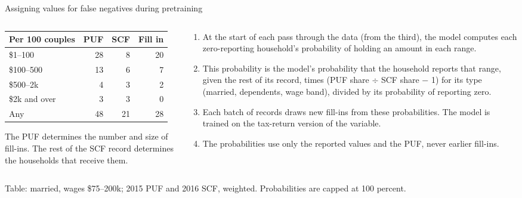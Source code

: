 \documentclass[11pt,aspectratio=169]{beamer}
\newcommand{\slidenote}[1]{\par\vfill{\scriptsize\color{yalegrey}#1}}
\begin{document}
\begin{frame}{Assigning values for false negatives during pretraining}
  \begin{columns}[T]
    \begin{column}{0.44\textwidth}
      \centering
      \small
      \begin{tabular}{lrrr}
        \toprule
        Per 100 couples & PUF & SCF & Fill in \\
        \midrule
        \$1--100      & 28 & 8 & 20 \\
        \$100--500    & 13 & 6 & 7 \\
        \$500--2k     & 4  & 3 & 2 \\
        \$2k and over & 3  & 3 & 0 \\
        \midrule
        Any           & 48 & 21 & 28 \\
        \bottomrule
      \end{tabular}

      \vspace{0.8em}
      \raggedright
      The PUF determines the number and size of fill-ins.
      The rest of the SCF record determines the households that receive them.
    \end{column}
    \begin{column}{0.53\textwidth}
      \footnotesize
      \begin{enumerate}
        \item At the start of each pass through the data (from the third), the model computes each
              zero-reporting household's probability of holding an amount in each range.
        \item This probability is the model's probability that the household reports that range,
              given the rest of its record, times (PUF share $\div$ SCF share $-$ 1) for its type
              (married, dependents, wage band), divided by its probability of reporting zero.
        \item Each batch of records draws new fill-ins from these probabilities. The model is
              trained on the tax-return version of the variable.
        \item The probabilities use only the reported values and the PUF, never earlier fill-ins.
      \end{enumerate}
    \end{column}
  \end{columns}
  \slidenote{Table: married, wages \$75--200k; 2015 PUF and 2016 SCF, weighted. Probabilities are capped at 100 percent.}
\end{frame}
\end{document}
